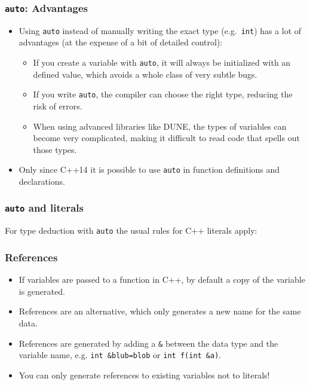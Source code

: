 \documentclass[aspectratio=169,ignorenonframetext,11pt]{beamer}
\def\inline{\lstinline[basicstyle=\small\ttfamily]}
\begin{document}
\begin{frame}[fragile]
\frametitle{\texttt{auto}: Advantages}

\begin{itemize}
\item Using \inline!auto! instead of manually writing the exact type (e.g.~\inline!int!) has a lot of advantages (at the expense of a bit of detailed control):
\begin{itemize}
\item If you create a variable with \inline!auto!, it will always be initialized with an defined value, which avoids a whole class of very subtle bugs.
\item If you write \inline!auto!, the compiler can choose the right type, reducing the risk of errors.
\item When using advanced libraries like DUNE, the types of variables can become very complicated, making it difficult to read code that spells out those types.
\end{itemize}
\item Only since C++14 it is possible to use \inline!auto! in function definitions and declarations.
\end{itemize}

\end{frame}

\begin{frame}
\frametitle{\texttt{auto} and literals}

For type deduction with \inline!auto! the usual rules for C++ literals apply:

\begin{codeblock}
  
\end{codeblock}
\end{frame}

\begin{frame}[fragile]
  \frametitle{References}
  \begin{itemize}
  \item If variables are passed to a function in C++, by default a copy of the variable is generated. 
  \item References are an alternative, which only generates a new name for the same data. 
  \item References are generated by adding a \inline!&! between the data type and the variable name, e.g. \inline!int &blub=blob! or \inline!int f(int &a)!. 
  \item You can only generate references to existing variables not to literals!
  \end{itemize}
  
\end{frame}
\end{document}
